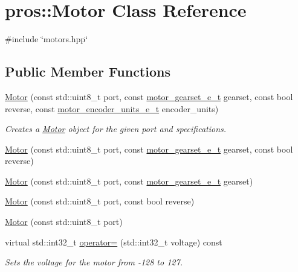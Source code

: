 \hypertarget{classpros_1_1Motor}{}\section{pros\+:\+:Motor Class Reference}
\label{classpros_1_1Motor}


{\ttfamily \#include \char`\"{}motors.\+hpp\char`\"{}}

\subsection*{Public Member Functions}
\begin{DoxyCompactItemize}
\item 
\hyperlink{classpros_1_1Motor_a5be9a41f9877208c887d5e2c081bc72e}{Motor} (const std\+::uint8\+\_\+t port, const \hyperlink{motors_8h_aa2f1c305c998abc3bf8dd1f76fa4da8b}{motor\+\_\+gearset\+\_\+e\+\_\+t} gearset, const bool reverse, const \hyperlink{motors_8h_a6677ba23760c558fd8b7b4e1e00a6123}{motor\+\_\+encoder\+\_\+units\+\_\+e\+\_\+t} encoder\+\_\+units)
\begin{DoxyCompactList}\small\item\em Creates a \hyperlink{classpros_1_1Motor}{Motor} object for the given port and specifications. \end{DoxyCompactList}\item 
\hyperlink{classpros_1_1Motor_a512050b652bf3034a21da12bf2b663ac}{Motor} (const std\+::uint8\+\_\+t port, const \hyperlink{motors_8h_aa2f1c305c998abc3bf8dd1f76fa4da8b}{motor\+\_\+gearset\+\_\+e\+\_\+t} gearset, const bool reverse)
\item 
\hyperlink{classpros_1_1Motor_aff27ad42b72a59c35e36a665bcd763a6}{Motor} (const std\+::uint8\+\_\+t port, const \hyperlink{motors_8h_aa2f1c305c998abc3bf8dd1f76fa4da8b}{motor\+\_\+gearset\+\_\+e\+\_\+t} gearset)
\item 
\hyperlink{classpros_1_1Motor_a822e0023951996ca7eff13ffe9cf953d}{Motor} (const std\+::uint8\+\_\+t port, const bool reverse)
\item 
\hyperlink{classpros_1_1Motor_a767b4ad39251b8e8411fae17a35b24ba}{Motor} (const std\+::uint8\+\_\+t port)
\item 
virtual std\+::int32\+\_\+t \hyperlink{classpros_1_1Motor_a4cf8a9518eb6cd268d27151f0df7fd38}{operator=} (std\+::int32\+\_\+t voltage) const
\begin{DoxyCompactList}\small\item\em Sets the voltage for the motor from -\/128 to 127. \end{DoxyCompactList}\item 

\end{DoxyCompactItemize}
